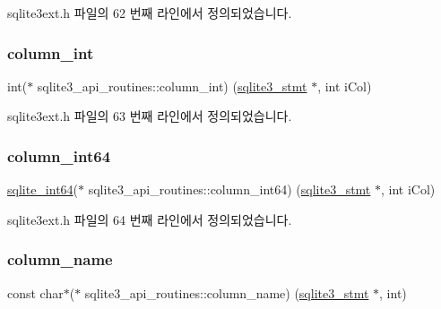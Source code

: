 sqlite3ext.\+h 파일의 62 번째 라인에서 정의되었습니다.

\mbox{\label{structsqlite3__api__routines_a066b63e4ca0f83af9eaba45b8db3e6be}} 
\subsubsection{\texorpdfstring{column\+\_\+int}{column\_int}}
{\footnotesize\ttfamily int($\ast$ sqlite3\+\_\+api\+\_\+routines\+::column\+\_\+int) (\hyperlink{sqlite3_8h_af2a033da1327cdd77f0a174a09aedd0c}{sqlite3\+\_\+stmt} $\ast$, int i\+Col)}



sqlite3ext.\+h 파일의 63 번째 라인에서 정의되었습니다.

\mbox{\label{structsqlite3__api__routines_a6992d17196cce6a9c893df0e69ea8b17}} 
\subsubsection{\texorpdfstring{column\+\_\+int64}{column\_int64}}
{\footnotesize\ttfamily \hyperlink{sqlite3_8h_a520a95f9080c018b2fade39885bd2e2a}{sqlite\+\_\+int64}($\ast$ sqlite3\+\_\+api\+\_\+routines\+::column\+\_\+int64) (\hyperlink{sqlite3_8h_af2a033da1327cdd77f0a174a09aedd0c}{sqlite3\+\_\+stmt} $\ast$, int i\+Col)}



sqlite3ext.\+h 파일의 64 번째 라인에서 정의되었습니다.

\mbox{\label{structsqlite3__api__routines_a8ae08c78d80fae61c0abeb80a7cd70f5}} 
\subsubsection{\texorpdfstring{column\+\_\+name}{column\_name}}
{\footnotesize\ttfamily const char$\ast$($\ast$ sqlite3\+\_\+api\+\_\+routines\+::column\+\_\+name) (\hyperlink{sqlite3_8h_af2a033da1327cdd77f0a174a09aedd0c}{sqlite3\+\_\+stmt} $\ast$, int)}



